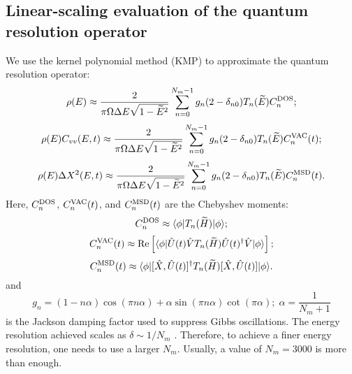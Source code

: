\documentclass[12pt,a4paper]{report}
\begin{document}
\subsection{Linear-scaling evaluation of the quantum resolution operator}

We use the kernel polynomial method (KMP) \cite{weisse2006rmp} to approximate the quantum resolution operator:
\begin{equation}
\label{equation:KPM_DOS}
 \rho(E) \approx \frac{2}{\pi \Omega \Delta E \sqrt{1-\widetilde{E}^2}}
 \sum_{n=0}^{N_m-1} g_n (2-\delta_{n0}) T_n(\widetilde{E})
     C_n^{\rm DOS};
\end{equation}
\begin{equation}
\label{equation:KPM_VAC}
 \rho (E) C_{vv}(E, t) \approx
 \frac{2}{\pi \Omega \Delta E \sqrt{1-\widetilde{E}^2}}
 \sum_{n=0}^{N_m-1} g_n (2-\delta_{n0})
     T_n(\widetilde{E}) C_n^{\rm VAC} (t);
\end{equation}
\begin{equation}
\label{equation:KPM_MSD}
 \rho (E) \Delta X^2(E, t) \approx
 \frac{2}{\pi \Omega \Delta E \sqrt{1-\widetilde{E}^2}}
 \sum_{n=0}^{N_m-1} g_n (2-\delta_{n0}) T_n(\widetilde{E})
     C_n^{\rm MSD} (t).
\end{equation}
Here, $C_n^{\rm DOS}$, $C_n^{\rm VAC}(t)$,
and $C_n^{\rm MSD}(t)$ are the Chebyshev moments:
\begin{equation}
\label{equation:C_n_DOS}
 C_n^{\rm DOS} \approx \langle \phi | T_n(\widetilde{H}) |\phi \rangle;
\end{equation}
\begin{equation}
\label{equation:C_n_VAC}
 C_n^{\rm VAC}(t) \approx \textmd{Re}
 \left[
 \langle\phi|\hat{U}(t)\hat{V} T_n(\widetilde{H}) \hat{U}(t)^{\dagger}\hat{V}|\phi \rangle
 \right];
\end{equation}
\begin{equation}
\label{equation:C_n_MSD}
 C_n^{\rm MSD}(t) \approx
 \langle\phi|[\hat{X}, \hat{U}(t)]^{\dagger} T_n(\widetilde{H}) [\hat{X}, \hat{U}(t)]|\phi \rangle.
\end{equation}
and 
\begin{equation}
 g_n = \left(1 - n \alpha \right) \cos\left(\pi n \alpha \right)
     + \alpha \sin\left(\pi n \alpha \right) \cot\left(\pi \alpha\right); \; \alpha = \frac{1}{N_m+1}
\end{equation}
is the Jackson damping factor used to suppress Gibbs oscillations. The energy resolution achieved scales as $\delta \sim 1/N_m$ \cite{weisse2006rmp}. Therefore, to achieve a finer energy resolution, one needs to use a larger $N_m$. Usually, a value of $N_m=3000$ is more than enough.
\end{document}
